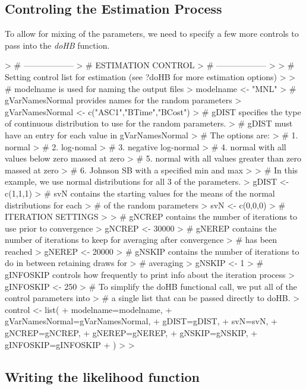 \documentclass{article}
\begin{document}
\subsection*{Controling the Estimation Process}

To allow for mixing of the parameters, we need to specify a few more controls to pass into the \emph{doHB} function.

\begin{Schunk}
\begin{Sinput}
> # ------------------
> # ESTIMATION CONTROL
> # ------------------
> 
> # Setting control list for estimation (see ?doHB for more estimation options)
> 
> # modelname is used for naming the output files
> modelname <- "MNL"          
> # gVarNamesNormal provides names for the random parameters
> gVarNamesNormal <- c("ASC1","BTime","BCost")
> # gDIST specifies the type of continuous distribution to use for the random parameters. 
> # gDIST must have an entry for each value in gVarNamesNormal
> # The options are:
> # 1. normal
> # 2. log-nomal
> # 3. negative log-normal
> # 4. normal with all values below zero massed at zero
> # 5. normal with all values greater than zero massed at zero
> # 6. Johnson SB with a specified min and max
> 
> # In this example, we use normal distributions for all 3 of the parameters.
> gDIST <- c(1,1,1)
> # svN contains the starting values for the means of the normal distributions for each 
> # of the random parameters
> svN <- c(0,0,0)  
> # ITERATION SETTINGS
> 
> # gNCREP contains the number of iterations to use prior to convergence
> gNCREP    <- 30000
> # gNEREP contains the number of iterations to keep for averaging after convergence 
> # has been reached
> gNEREP    <- 20000             
> # gNSKIP contains the number of iterations to do in between retaining draws for 
> # averaging
> gNSKIP    <- 1		       
> # gINFOSKIP controls how frequently to print info about the iteration process
> gINFOSKIP <- 250   
> # To simplify the doHB functional call, we put all of the control parameters into 
> # a single list that can be passed directly to doHB.
> control <- list(
+      modelname=modelname,
+      gVarNamesNormal=gVarNamesNormal,
+      gDIST=gDIST,
+      svN=svN,
+      gNCREP=gNCREP,
+      gNEREP=gNEREP,
+      gNSKIP=gNSKIP,
+      gINFOSKIP=gINFOSKIP
+ )
> 
> 
\end{Sinput}
\end{Schunk}

\subsection*{Writing the likelihood function}
\end{document}
